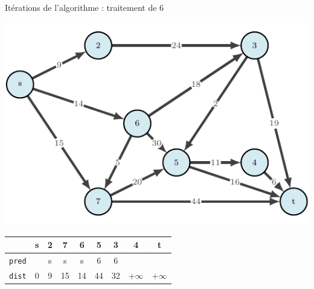 \begin{frame}{Itérations de l'algorithme : traitement de $6$}
    \begin{center}
        \includegraphics[height=.6\textheight]{fig/dijkstra-0.pdf}      
    \begin{tabular}{c|cccccccc}
      
        & \textbf{s}   &\textbf{2}     &7      &\textbf{6}     &5      &3      &4      &t      \\
        \hline
        \texttt{pred} & &s      &s      &s      &6      &6      &       &       \\
        \texttt{dist} & 0       &9      &15     &14     &44     &32     &$+\infty$    &$+\infty$    \\
                           \end{tabular}
\end{center}
\end{frame}


